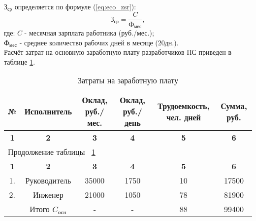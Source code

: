 ${\mbox{З}_{\mbox{ср}}}$ определяется по формуле (\ref{eq:eco_zsr}):
\begin{equation}
\mbox{З}_{\mbox{ср}} = \frac{C}{\mbox{Ф}_{\mbox{мес}}},
\label{eq:eco_zsr}
\end{equation}
где:	${C}$ - месячная зарплата работника (руб./мес.); \\
	${\mbox{Ф}_{\mbox{мес}}}$ - среднее количество рабочих дней в месяце (20дн.). \\

Расчёт затрат на основную заработную плату разработчиков ПС приведен в таблице \ref{tab:eco_zarplata}.

\begin{center}
\begin{longtable}{|c|c|c|c|c|c|}
\caption{Затраты на заработную плату} \label{tab:eco_zarplata} \\ \hline
\multicolumn{1}{|c|}{\textbf{№}} & \multicolumn{1}{c|}{\textbf{Исполнитель}} & 
\multicolumn{1}{p{2.5cm}|}{\textbf{Оклад, руб./мес.}} &   \multicolumn{1}{p{2.5cm}|}{\textbf{Оклад, руб./день}} & 
\multicolumn{1}{p{3.5cm}|}{\textbf{Трудоемкость, чел. дней}} & \multicolumn{1}{p{2cm}|}{\textbf{Сумма, руб.}} \\ \hline

\multicolumn{1}{|c|}{\textbf{1}} &   \multicolumn{1}{c|}{\textbf{2}} & 
\multicolumn{1}{c|}{\textbf{3}} &   \multicolumn{1}{c|}{\textbf{4}} & 
\multicolumn{1}{c|}{\textbf{5}} & \multicolumn{1}{c|}{\textbf{6}} \\ \hline
\endfirsthead

\multicolumn{6}{|l|}{{Продолжение таблицы ~\ref{tab:eco_zarplata}}} \\ %
\hline
\multicolumn{1}{|c|}{\textbf{1}} &   \multicolumn{1}{c|}{\textbf{2}} & 
\multicolumn{1}{c|}{\textbf{3}} &   \multicolumn{1}{c|}{\textbf{4}} & 
\multicolumn{1}{c|}{\textbf{5}} & \multicolumn{1}{c|}{\textbf{6}} \\ \hline
\endhead

\endfoot

\hline
\endlastfoot

1. & Руководитель & 35000 & 1750 & 10 & 17500 \\ \hline
2. & Инженер & 21000 & 1050 & 78 & 81900\\ \hline
 & Итого ${C_{\mbox{осн}}}$ & - & - & 88 & 99400 \\

\hline

\end{longtable}
\end{center}






